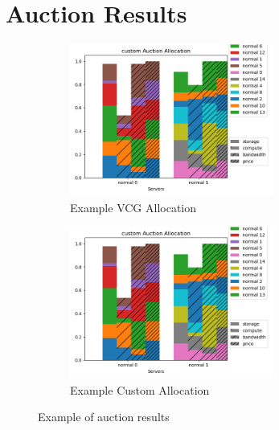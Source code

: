 \documentclass[fleqn]{article}
\begin{document}
\section{Auction Results}\label{sec:auction-results}
\begin{figure}[H]
    \begin{subfigure}{0.5\textwidth}
        \includegraphics[width=1\linewidth, height=5cm]{../results/vcg_auction.png}
        \caption{Example VCG Allocation}
    \end{subfigure}
    \begin{subfigure}{0.5\textwidth}
        \includegraphics[width=1\linewidth, height=5cm]{../results/iterative_vcg_auction.png}
        \caption{Example Custom Allocation}
    \end{subfigure}
    \caption{Example of auction results}
\end{figure}
\end{document}

